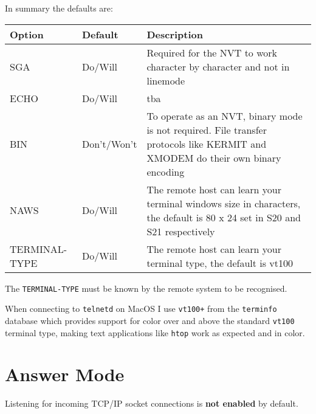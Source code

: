 \newpage
In summary the defaults are:

\begin{tabular}{p{6em} | p{5.5em} | p{}}
\hline
\textbf{Option}	& \textbf{Default}	& \textbf{Description} \\
\hline
SGA				& Do/Will		& Required for the NVT to work character by character and not in linemode \\
ECHO			& Do/Will		& tba \\
BIN				& Don't/Won't	& To operate as an NVT, binary mode is not required. File transfer protocols like KERMIT and XMODEM do their own binary encoding \\
NAWS			& Do/Will		& The remote host can learn your terminal windows size in characters, the default is 80 x 24 set in S20 and S21 respectively \\
TERMINAL-TYPE	& Do/Will		& The remote host can learn your terminal type, the default is vt100 \\
\hline
\end{tabular}
\bigskip

The \texttt{TERMINAL-TYPE} must be known by the remote system to be recognised.

When connecting to \texttt{telnetd} on MacOS I use \texttt{vt100+} from the \texttt{terminfo} database which provides support for color over and above the standard
\texttt{vt100} terminal type, making text applications like \texttt{htop} work as expected and in color.


\newpage
\section{Answer Mode}

Listening for incoming TCP/IP socket connections is \textbf{not enabled} by default.

